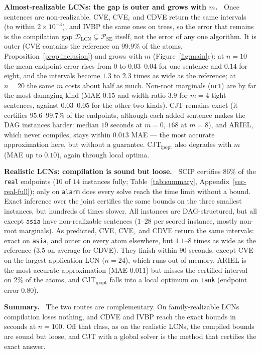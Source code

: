 \documentclass{article} %
\newenvironment{revblock}{\color{blue}}{}
\newcommand{\DLCN}{\mathcal{D}_{\mathrm{LCN}}}
\begin{document}
\begin{revblock}
\textbf{Almost-realizable LCNs: the gap is outer and grows with $m$.~}
Once sentences are non-realizable, CVE, CVE$_\varepsilon$ and CDVE return the same intervals (to within $2\times10^{-3}$), and IVBP the same ones on trees, so the error that remains is the compilation gap $\DLCN\subsetneq\mathcal P_{\mathrm{SE}}$ itself, not the error of any one algorithm. It is outer (CVE contains the reference on $99.9\%$ of the atoms, Proposition~\ref{prop:inclusion}) and grows with $m$ (Figure~\ref{fig:main}c): at $n{=}10$ the mean endpoint error rises from $0$ to $0.03$--$0.04$ for one sentence and $0.14$ for eight, and the intervals become $1.3$ to $2.3$ times as wide as the reference; at $n{=}20$ the same $m$ costs about half as much. Non-root marginals (\texttt{nr1}) are by far the most damaging kind (MAE $0.15$ and width ratio $3.9$ for $m{=}4$ tight sentences, against $0.03$--$0.05$ for the other two kinds). CJT remains exact (it certifies $95.6$--$99.7\%$ of the endpoints, although each added sentence makes the DAG instances harder: median $19$ seconds at $m{=}0$, $168$ at $m{=}8$), and ARIEL, which never compiles, stays within $0.013$ MAE --- the most accurate approximation here, but without a guarantee. CJT$_{\text{ipopt}}$ also degrades with $m$ (MAE up to $0.10$), again through local optima.

\textbf{Realistic LCNs: compilation is sound but loose.~}
SCIP certifies $86\%$ of the \texttt{real} endpoints ($10$ of $14$ instances fully; Table~\ref{tab:summary}, Appendix~\ref{sec-real-full}); only on \texttt{alarm} does every solve reach the time limit without a bound. Exact inference over the joint certifies the same bounds on the three smallest instances, but hundreds of times slower. All instances are DAG-structured, but all except \texttt{asia} have non-realizable sentences ($1$--$28$ per scored instance, mostly non-root marginals). As predicted, CVE, CVE$_\varepsilon$ and CDVE return the same intervals: exact on \texttt{asia}, and outer on every atom elsewhere, but $1.1$--$8$ times as wide as the reference ($3.5$ on average for CDVE). They finish within $90$ seconds, except CVE on the largest application LCN ($n{=}24$), which runs out of memory. ARIEL is the most accurate approximation (MAE $0.011$) but misses the certified interval on $2\%$ of the atoms, and CJT$_{\text{ipopt}}$ falls into a local optimum on \texttt{tank} (endpoint error $0.80$).

\textbf{Summary.~}
The two routes are complementary. On family-realizable LCNs compilation loses nothing, and CDVE and IVBP reach the exact bounds in seconds at $n{=}100$. Off that class, as on the realistic LCNs, the compiled bounds are sound but loose, and CJT with a global solver is the method that certifies the exact answer.
\end{revblock}
\end{document}
